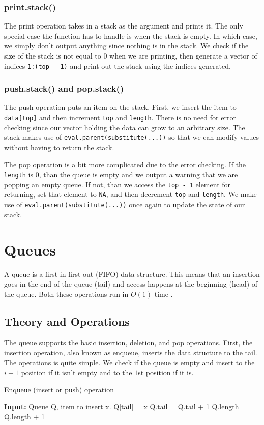 \documentclass[11pt]{article}
\begin{document}
\subsubsection{print.stack()}
The print operation takes in a stack as the argument and prints it. The only special case the function has to handle is when the stack is empty. In which case, we simply don't output anything since nothing is in the stack. We check if the size of the stack is not equal to $0$ when we are printing, then generate a vector of indices {\tt 1:(top - 1)} and print out the stack using the indices generated.

\subsubsection{push.stack() and pop.stack()}
The push operation puts an item on the stack. First, we insert the item to {\tt data[top]} and then increment {\tt top} and {\tt length}. There is no need for error checking since our vector holding the data can grow to an arbitrary size. The stack makes use of {\tt eval.parent(substitute(...))} \cite{R_pass_by_ref} so that we can modify values without having to return the stack. 

The pop operation is a bit more complicated due to the error checking. If the {\tt length} is $0$, than the queue is empty and we output a warning that we are popping an empty queue. If not, than we access the {\tt top - 1} element for returning, set that element to {\tt NA}, and then decrement {\tt top} and {\tt length}. We make use of {\tt eval.parent(substitute(...))} once again to update the state of our stack.


\section{Queues} \label{queues}
A queue is a first in first out (FIFO) data structure. This means that an insertion goes in the end of the queue (tail) and access happens at the beginning (head) of the queue. Both these operations run in $O(1)$ time \cite{CLRS}.
\subsection{Theory and Operations} \label{queues:theory}
The queue supports the basic insertion, deletion, and pop operations. First, the insertion operation, also known as enqueue, inserts the data structure to the tail. The operations is quite simple. We check if the queue is empty and insert to the $i + 1$ position if it isn't empty and to the $1$st position if it is.
\begin{algorithm}[H]
    \caption{Enqueue (insert or push) operation}
    \begin{algorithmic}[1]
        \State \textbf{Input: } Queue Q, item to insert x.
        \State Q[tail] = x
        \State Q.tail = Q.tail + 1
        \State Q.length = Q.length + 1
    \end{algorithmic}
\end{algorithm}
\end{document}
